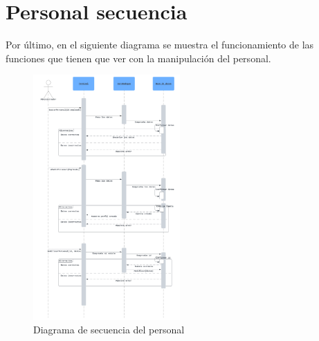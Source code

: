 \pagebreak

\section{Personal secuencia}

Por último, en el siguiente diagrama se muestra el funcionamiento de las funciones que tienen que ver con la manipulación del personal.

\begin{figure}[h]
    \centering
    \includegraphics[width=0.5\textwidth]{figures/personal-secuencia.png}
    \caption{Diagrama de secuencia del personal}
    \label{fig:personal}
\end{figure}
